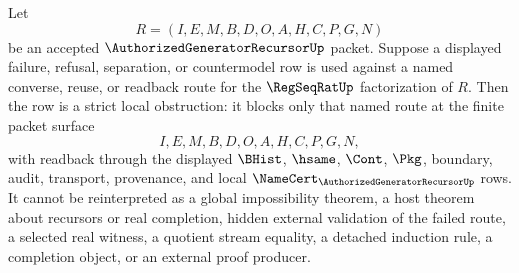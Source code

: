 \begin{corollary}
\label{cor:authorized-generator-recursor-regseqrat-route-strict-obstruction}
Let
$$
R=(I,E,M,B,D,O,A,H,C,P,G,N)
$$
be an accepted $\AuthorizedGeneratorRecursorUp$ packet. Suppose a displayed failure, refusal, separation, or countermodel row is used against a named converse, reuse, or readback route for the $\RegSeqRatUp$ factorization of $R$. Then the row is a strict local obstruction: it blocks only that named route at the finite packet surface
$$
I,E,M,B,D,O,A,H,C,P,G,N,
$$
with readback through the displayed $\BHist$, $\hsame$, $\Cont$, $\Pkg$, boundary, audit, transport, provenance, and local $\NameCert_{\AuthorizedGeneratorRecursorUp}$ rows. It cannot be reinterpreted as a global impossibility theorem, a host theorem about recursors or real completion, hidden external validation of the failed route, a selected real witness, a quotient stream equality, a detached induction rule, a completion object, or an external proof producer.
\end{corollary}
